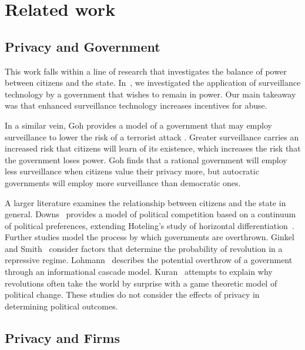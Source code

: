 
\section{Related work}
\label{sec:related}

\subsection{Privacy and Government}
This work falls within a line of research that investigates the balance of power between citizens and the state. In~\cite{laskowskigovernment}, we investigated the application of surveillance technology by a government that wishes to remain in power.  Our main takeaway was that enhanced surveillance technology increases incentives for abuse. 

In a similar vein, Goh provides a model of a government that may employ surveillance to lower the risk of a terrorist attack \cite{goh2015prosperity}.  Greater surveillance carries an increased risk that citizens will learn of its existence, which increases the risk that the government loses power.  Goh finds that a rational government will employ less surveillance when citizens value their privacy more, but autocratic governments will employ more surveillance than democratic ones.

A larger literature examines the relationship between citizens and the state in general.  Downs~\cite{downs1957economic} provides a model of political competition based on a continuum of political preferences, extending Hoteling's study of horizontal differentiation~\cite{press39hotelling}.  Further studies model the process by which governments are overthrown.  Ginkel and Smith~\cite{ginkel1999so} consider factors that determine the probability of revolution in a repressive regime.  Lohmann~\cite{lohmann1994dynamics} describes the potential overthrow of a government through an informational cascade model. Kuran~\cite{kuran1989sparks} attempts to explain why revolutions often take the world by surprise with a game theoretic model of political change.  These studies do not consider the effects of privacy in determining political outcomes.

\subsection{Privacy and Firms}

